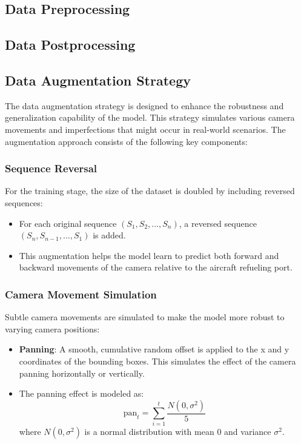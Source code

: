 \documentclass[12pt,oneside]{book} %
\begin{document}
\subsection{Data Preprocessing}

\subsection{Data Postprocessing}

\subsection{Data Augmentation Strategy}
The data augmentation strategy is designed to enhance the robustness and
generalization capability of the model. This strategy simulates various camera
movements and imperfections that might occur in real-world scenarios. The
augmentation approach consists of the following key components:

\subsubsection*{Sequence Reversal}

For the training stage, the size of the dataset is doubled by including
reversed sequences:

\begin{itemize}
    \item For each original sequence $(S_1, S_2, ..., S_n)$, a reversed sequence $(S_n,
              S_{n-1}, ..., S_1)$ is added.
    \item This augmentation helps the model learn to predict both forward and backward
          movements of the camera relative to the aircraft refueling port.
\end{itemize}

\subsubsection*{Camera Movement Simulation}

Subtle camera movements are simulated to make the model more robust to varying
camera positions:

\begin{itemize}
    \item \textbf{Panning}: A smooth, cumulative random offset is applied to the x and y coordinates of the bounding boxes. This simulates the effect of the camera panning horizontally or vertically.
    \item The panning effect is modeled as:
          \begin{equation}
              \text{pan}_t = \sum_{i=1}^t \frac{N(0, \sigma^2)}{5}
          \end{equation}
          where $N(0, \sigma^2)$ is a normal distribution with mean 0 and variance $\sigma^2$.
\end{itemize}
\end{document}
